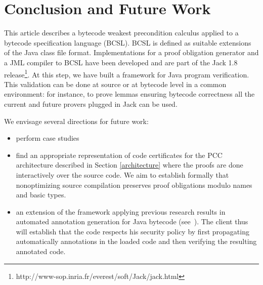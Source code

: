 \section{Conclusion and Future Work}\label{conclusion}
This article describes a bytecode weakest precondition calculus applied to a bytecode specification language (BCSL).
BCSL is defined as suitable extensions of the Java class file format.
Implementations for a proof obligation generator and a JML compiler to BCSL have been developed and are part of the Jack 1.8 release\footnote{http://www-sop.inria.fr/everest/soft/Jack/jack.html}.
At this step, we have built a framework for Java program verification. This validation can be done at source or at bytecode level in a common environment: for instance, to prove lemmas ensuring bytecode correctness all the current and future provers plugged in Jack can be used.

 We envisage several directions for future work:
\begin{itemize}
  \item perform case studies
  \item find an appropriate representation of code certificates for the PCC architecture described in Section \ref{architecture}
  where the proofs are done interactively over the source code. We aim to establish formally that nonoptimizing source compilation
preserves proof obligations modulo names and basic types.
   
  \item an extension of the framework applying previous research results in automated annotation generation for
 Java bytecode (see~\cite{PBBHL}). The client thus will establish that the code respects his security policy %
by first propagating automatically annotations in the loaded code and then verifying the resulting annotated code.

\end{itemize}



